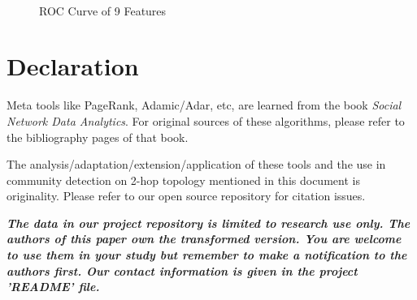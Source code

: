 \documentclass[11pt,a4paper]{article}
\begin{document}
\begin{figure}[htb]
\begin{center}
        \\%
%
    \end{center}
    \caption{%
        ROC Curve of 9 Features
     }%
     \label{fig:roc_sub_all}
\end{figure}


 

\section*{Declaration}

Meta tools like PageRank, Adamic/Adar, etc, are learned from the book
\textit{Social Network Data Analytics}. For original sources of these 
algorithms, please refer to the bibliography pages of that book.

The analysis/adaptation/extension/application of these tools and 
the use in community detection on 2-hop topology mentioned 
in this document is originality. Please refer to our open source 
repository for citation issues.

\textbf{\textit{
The data in our project repository is limited to research use only. 
The authors of this paper own the transformed version. You are welcome
to use them in your study but remember to make a notification to the 
authors first. Our contact information is given in the project 'README' file. }}
\end{document}
